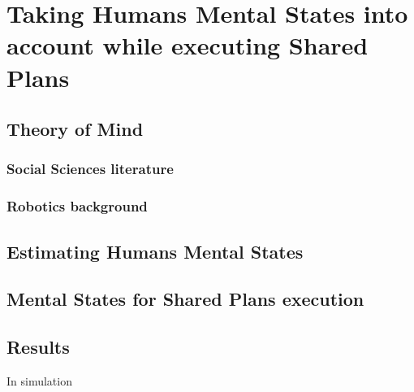 \documentclass[english,a4paper,11pt,twoside]{StyleThese}
\begin{document}
\setcounter{chapter}{2} %
\dominitoc
\faketableofcontents
\fi

\chapter{Taking Humans Mental States into account while executing Shared Plans}
\minitoc

\label{ch:MS}

\section{Theory of Mind}
\subsection{Social Sciences literature}
\subsection{Robotics background}

\section{Estimating Humans Mental States}

\section{Mental States for Shared Plans execution}

\section{Results}

In simulation

\ifdefined{}
\else


\end{document}
